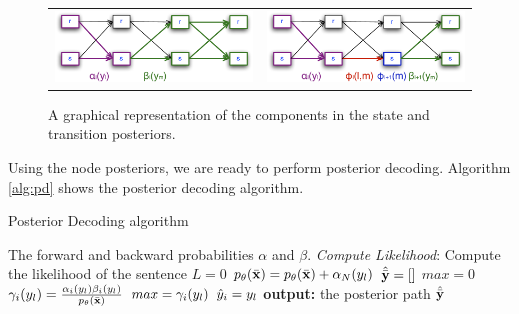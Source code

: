 \begin{figure}
\begin{center}
\begin{tabular}{cc}

\includegraphics[scale=.5]{figs/sequences/statePost}
& \includegraphics[scale=.5]{figs/sequences/transPost}\\
\end{tabular}
\caption[Posterior Illustration.]{\label{fig:posteriors} A graphical representation of the components in the state and transition posteriors.}

\end{center}
\end{figure}

Using the node posteriors, we are ready to perform posterior
decoding. Algorithm \ref{alg:pd} shows the posterior decoding algorithm.

\begin{algorithm}[t]
   \caption{Posterior Decoding algorithm \label{alg:pd}}
\begin{algorithmic}[1]
    The forward and backward probabilities
       $\alpha$ and $\beta$.
   \STATE  \emph{Compute Likelihood}: Compute the likelihood of the
   sentence
   \STATE $L = 0$
   \STATE $p_{\theta}(\bar{\mathbf{x}}) = p_{\theta}(\bar{\mathbf{x}}) + \alpha_N({y}_l)$
   \ENDFOR 
   \STATE $\hat {\bar{\mathbf{y}}} = []$
    \STATE $max = 0$
     \STATE $\gamma_i({y}_l)  =  \frac{\alpha_i({y}_l)
       \beta_i({y}_l)}{p_{\theta}(\bar{\mathbf{x}})}$
     \STATE $max = \gamma_i({y}_l)$
     \STATE $\hat  y_i = {y}_l$
     \ENDIF
     \ENDFOR 
     \ENDFOR 
   \STATE \textbf{output:} the posterior path $\hat {\bar{\mathbf{y}}}$
\end{algorithmic}
\end{algorithm}




